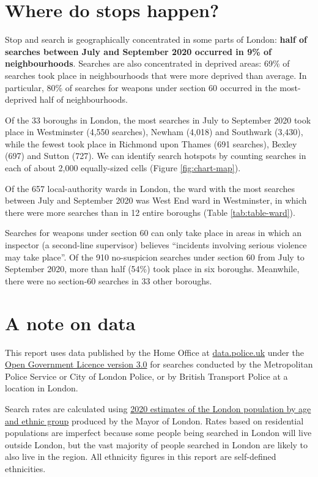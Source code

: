 \documentclass[
  a4paper,
  twoside, 11pt]{article}
\begin{document}
\hypertarget{where-do-stops-happen}{%
\section{Where do stops happen?}\label{where-do-stops-happen}}

Stop and search is geographically concentrated in some parts of London: \textbf{half of searches between July and September 2020 occurred in 9\% of neighbourhoods}. Searches are also concentrated in deprived areas: 69\% of searches took place in neighbourhoods that were more deprived than average. In particular, 80\% of searches for weapons under section 60 occurred in the most-deprived half of neighbourhoods.

Of the 33 boroughs in London, the most searches in July to September 2020 took place in Westminster (4,550 searches), Newham (4,018) and Southwark (3,430), while the fewest took place in Richmond upon Thames (691 searches), Bexley (697) and Sutton (727). We can identify search hotspots by counting searches in each of about 2,000 equally-sized cells (Figure \ref{fig:chart-map}).

Of the 657 local-authority wards in London, the ward with the most searches between July and September 2020 was West End ward in Westminster, in which there were more searches than in 12 entire boroughs (Table \ref{tab:table-ward}).

Searches for weapons under section 60 can only take place in areas in which an inspector (a second-line supervisor) believes ``incidents involving serious violence may take place''. Of the 910 no-suspicion searches under section 60 from July to September 2020, more than half (54\%) took place in six boroughs. Meanwhile, there were no section-60 searches in 33 other boroughs.

\hypertarget{a-note-on-data}{%
\section{A note on data}\label{a-note-on-data}}

This report uses data published by the Home Office at \href{https://data.police.uk/}{data.police.uk} under the \href{https://www.nationalarchives.gov.uk/doc/open-government-licence/version/3/}{Open Government Licence version 3.0} for searches conducted by the Metropolitan Police Service or City of London Police, or by British Transport Police at a location in London.

Search rates are calculated using \href{https://data.london.gov.uk/dataset/ethnic-group-population-projections}{2020 estimates of the London population by age and ethnic group} produced by the Mayor of London. Rates based on residential populations are imperfect because some people being searched in London will live outside London, but the vast majority of people searched in London are likely to also live in the region. All ethnicity figures in this report are self-defined ethnicities.
\end{document}
